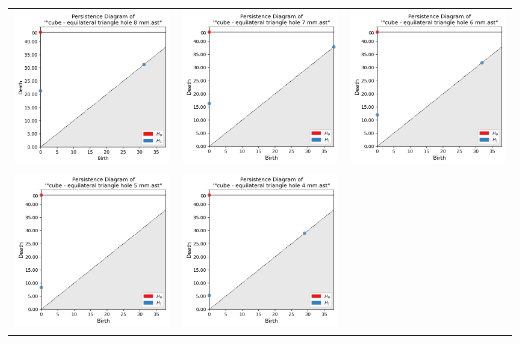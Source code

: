 \documentclass[ma]{uncgdissertationexp}
\theoremstyle{plain}
\theoremstyle{definition}
\theoremstyle{remark}
\begin{document}
\begin{table}[H]
\begin{center}
    \begin{tabular}{ccc}
         \includegraphics[width=1.875in]{Final Run, (cube - equilateral triangle hole 8 mm) persdia.png} &
         \includegraphics[width=1.875in]{Final Run, (cube - equilateral triangle hole 7 mm) persdia.png} &  
         \includegraphics[width=1.875in]{Final Run, (cube - equilateral triangle hole 6 mm) persdia.png} \\
         \includegraphics[width=1.875in]{Final Run, (cube - equilateral triangle hole 5 mm) persdia.png} & 
         \includegraphics[width=1.875in]{Final Run, (cube - equilateral triangle hole 4 mm) persdia.png} & 

\end{tabular}
\end{center}
\end{table}
\end{document}

